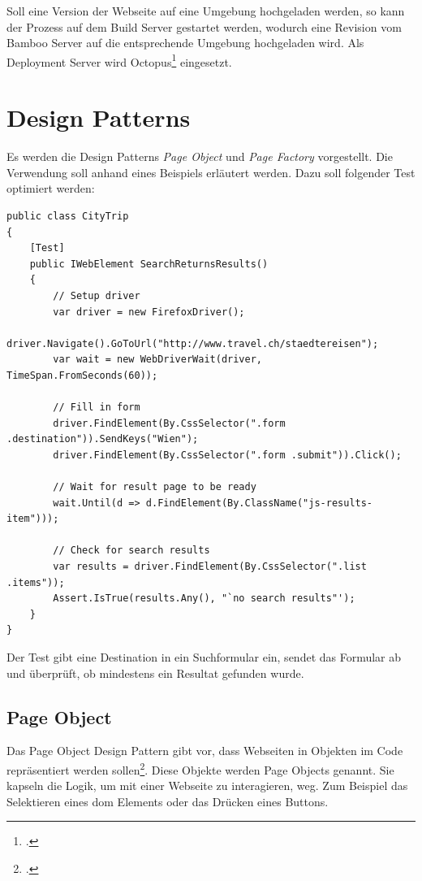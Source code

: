 Soll eine Version der Webseite auf eine Umgebung hochgeladen werden, so kann der Prozess auf dem Build Server gestartet werden, wodurch eine Revision vom Bamboo Server auf die entsprechende Umgebung hochgeladen wird. Als Deployment Server wird Octopus\footcite{Octopus_Deploy_2015-09-28} eingesetzt.

\section{Design Patterns}
\label{sec:umsetzung:patterns}
Es werden die Design Patterns \textit{Page Object} und \textit{Page Factory} vorgestellt. Die Verwendung soll anhand eines Beispiels erläutert werden. Dazu soll folgender Test optimiert werden:

\begin{lstlisting}        
public class CityTrip
{	    	
	[Test]
	public IWebElement SearchReturnsResults() 
	{
		// Setup driver
		var driver = new FirefoxDriver();
		driver.Navigate().GoToUrl("http://www.travel.ch/staedtereisen");
		var wait = new WebDriverWait(driver, TimeSpan.FromSeconds(60));
		
		// Fill in form
		driver.FindElement(By.CssSelector(".form .destination")).SendKeys("Wien");
		driver.FindElement(By.CssSelector(".form .submit")).Click();
		
		// Wait for result page to be ready
		wait.Until(d => d.FindElement(By.ClassName("js-results-item")));
		
		// Check for search results
		var results = driver.FindElement(By.CssSelector(".list .items"));
		Assert.IsTrue(results.Any(), "`no search results"');
	}
}
\end{lstlisting}

Der Test gibt eine Destination in ein Suchformular ein, sendet das Formular ab und überprüft, ob mindestens ein Resultat gefunden wurde.

\subsection{Page Object}
\label{sec:umsetzung:patterns:pageobject}
Das Page Object Design Pattern gibt vor, dass Webseiten in Objekten im Code repräsentiert werden sollen\footcite{PageObjects}. Diese Objekte werden Page Objects genannt. Sie kapseln die Logik, um mit einer Webseite zu interagieren, weg. Zum Beispiel das Selektieren eines \gls{dom} Elements oder das Drücken eines Buttons.


